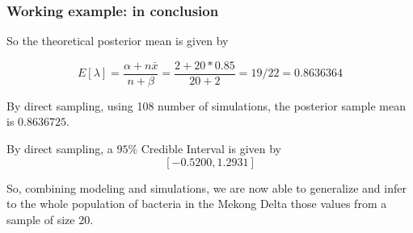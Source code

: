 \documentclass[border=5mm, convert, usenames, dvipsnames,beamer]{standalone}
\begin{document}
\begin{frame}[ fragile]{}
\frametitle{Working example: in conclusion}

\vspace{30}
\noindent
So the theoretical posterior mean is given by

$$
E[\lambda] =  \frac{\alpha + n \bar{x}}{n + \beta}  =  \frac{2 + 20 *0.85}{20 + 2} = 19/22 = 0.8636364
$$

\vspace{5}
\noindent
By direct sampling, using 108 number of simulations, the posterior sample mean is $0.8636725$. 

\vspace{5}
\noindent
By direct sampling, a $95\%$ Credible Interval is given by $$[−0.5200, 1.2931]$$

\vspace{10}
\noindent
So, combining modeling and simulations, we are now able to generalize and infer to the whole population of bacteria in the Mekong Delta those values from a sample of size 20.


\end{frame}

\end{document}
